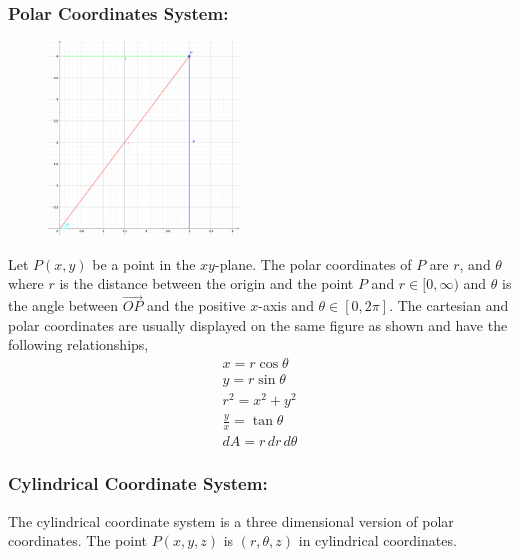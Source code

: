 \documentclass[14pt]{article}
\begin{document}
    \subsubsection{Polar Coordinates System:}
    \begin{figure}
        \vspace{-20pt}
        \includegraphics[width=0.45\textwidth]{polarCord.eps}
        \vspace{-100pt}
    \end{figure}
    Let $P(x,y )$ be a point in the $xy$-plane. The polar coordinates of
    $P$ are $r$, and $\theta$ where $r$ is the distance between the
    origin and the point $P$ and $r\in[0, \infty)$ and $\theta$ is the
    angle between $\vec{OP}$ and the positive $x$-axis and $\theta\in[0,
    2\pi]$. The cartesian and polar coordinates are usually displayed on
    the same figure as shown and have the following relationships,
    \begin{align*}
        x=r\cos\theta\\
        y=r\sin\theta\\
        r^2=x^2+y^2\\
        \frac{y}{x}=\tan\theta\\
        dA=r\, dr\, d\theta
    \end{align*} 
    \subsubsection{Cylindrical Coordinate System:}
    The cylindrical coordinate system is a three dimensional version of
    polar coordinates. The point $P(x,y,z)$ is $(r, \theta, z)$ in
    cylindrical coordinates.
\end{document}
